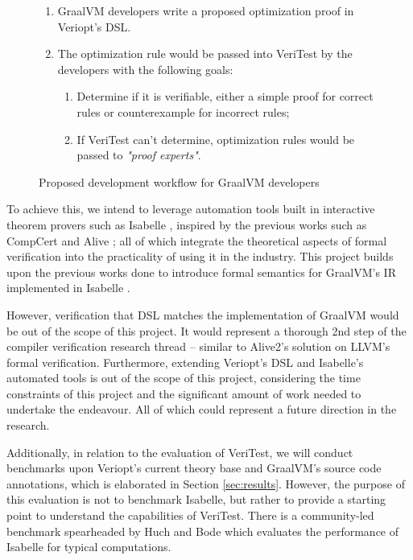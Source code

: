 \begin{figure}[h]
    \begin{enumerate}
        \item GraalVM developers write a proposed optimization proof in Veriopt's DSL.
        \item The optimization rule would be passed into VeriTest by the developers with the following goals:

              \begin{enumerate}
                \item Determine if it is verifiable, either a simple proof for correct rules or counterexample for incorrect rules;
                \item If VeriTest can't determine, optimization rules would be passed to \emph{"proof experts"}.
              \end{enumerate}
    \end{enumerate}
    \caption{Proposed development workflow for GraalVM developers}
    \label{fig:toolGoals}
\end{figure}

To achieve this, we intend to leverage automation tools built in interactive theorem provers such as Isabelle \cite{IsabelleHOL}, inspired by the 
previous works such as CompCert \cite{compcertVerification} and Alive \cite{AliveInLean,Alive2}; all of which integrate the theoretical aspects of 
formal verification into the practicality of using it in the industry. This project builds upon the previous works done to introduce formal semantics 
for GraalVM's \cite{graal} IR \cite{ATVA21_GraalVM_IR_Semantics, Term_Graph_Optimizations} implemented in Isabelle \cite{IsabelleHOL}.

However, verification that DSL matches the implementation of GraalVM would be out of the scope of this project. It would represent a thorough 
2nd step of the compiler verification research thread \cite[p. 5]{CompilerOptimization} -- similar to Alive2's \cite{Alive2} solution on 
LLVM's formal verification. Furthermore, extending Veriopt's DSL and Isabelle's 
automated tools is out of the scope of this project, considering the time constraints of this project and the significant amount of work needed to 
undertake the endeavour. All of which could represent a future direction in the research.

Additionally, in relation to the evaluation of VeriTest, we will conduct benchmarks upon Veriopt's current theory base and GraalVM's source 
code annotations, which is elaborated in Section \ref{sec:results}. However, the purpose of this evaluation is not to benchmark Isabelle, 
but rather to provide a starting point to understand the capabilities of VeriTest. There is a community-led benchmark spearheaded by Huch and Bode 
\cite{huch_isabelle_2022} which evaluates the performance of Isabelle for typical computations.

